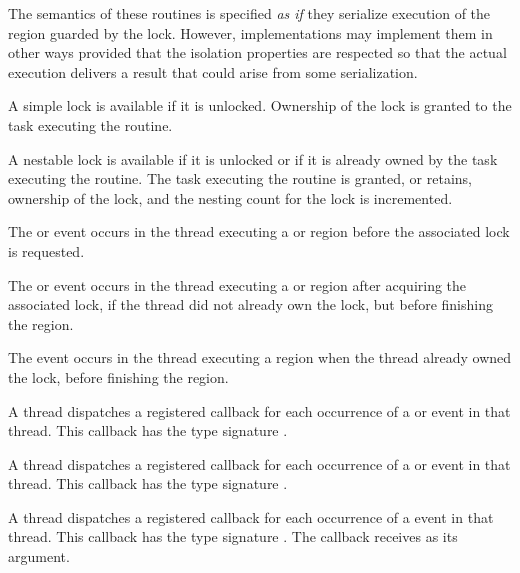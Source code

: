 \begin{note} The semantics of these routines is specified
\emph{as if} they serialize execution of the region guarded by the
lock. However, implementations may implement them in other ways
provided that the isolation properties are respected so that the
actual execution delivers a result that could arise from some
serialization. 
\end{note}

A simple lock is available if it is unlocked. Ownership of the lock is 
granted to the task executing the routine.

A nestable lock is available if it is unlocked or if it is already owned by 
the task executing the routine. The task executing the routine is granted, 
or retains, ownership of the lock, and the nesting count for the lock is 
incremented.

\events

The  or  event occurs in the thread 
executing a  or  region
before the associated lock is requested.

The  or  event occurs in the thread 
executing a  or  region
after acquiring the associated lock, if the thread did not already own the lock, 
but before finishing the region.

The  event occurs in the thread 
executing a  region
when the thread already owned the lock, 
before finishing the region.


\tools

A thread dispatches a registered 
callback for each occurrence of a  or  event 
in that thread.  This callback has the type signature .

A thread dispatches a registered 
callback for each occurrence of a  or  event 
in that thread.  This callback has the type signature .

A thread dispatches a registered 
callback for each occurrence of a  event 
in that thread. This callback has the type signature .
The callback receives  as its  argument.

